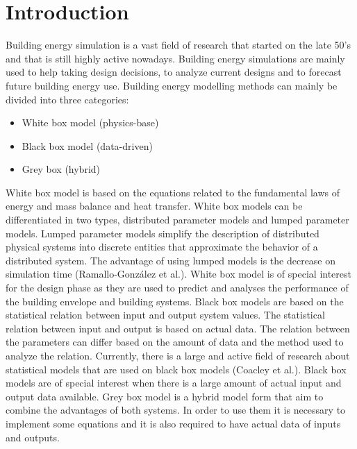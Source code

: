 
\section{Introduction}

Building energy simulation is a vast field of research that started on the late 50’s and that is still highly active nowadays. Building energy simulations are mainly used to help taking design decisions, to analyze current designs and to forecast future building energy use. Building energy modelling methods can mainly be divided into three categories:
\begin{itemize}
  
    \item White box model (physics-base)
    \item Black box model (data-driven)
    \item Grey box (hybrid)

\end{itemize}


White box model is based on the equations related to the fundamental laws of energy and mass balance and heat transfer. White box models can be differentiated in two types, distributed parameter models and lumped parameter models. Lumped parameter models simplify the description of distributed physical systems into discrete entities that approximate the behavior of a distributed system. The advantage of using lumped models is the decrease on simulation time (Ramallo-González et al.). White box model is of special interest for the design phase as they are used to predict and analyses the performance of the building envelope and building systems.
Black box models are based on the statistical relation between input and output system values. The statistical relation between input and output is based on actual data. The relation between the parameters can differ based on the amount of data and the method used to analyze the relation. Currently, there is a large and active field of research about statistical models that are used on black box models (Coacley et al.). Black box models are of special interest when there is a large amount of actual input and output data available.  
Grey box model is a hybrid model form that aim to combine the advantages of both systems. In order to use them it is necessary to implement some equations and it is also required to have actual data of inputs and outputs.

\newpage
